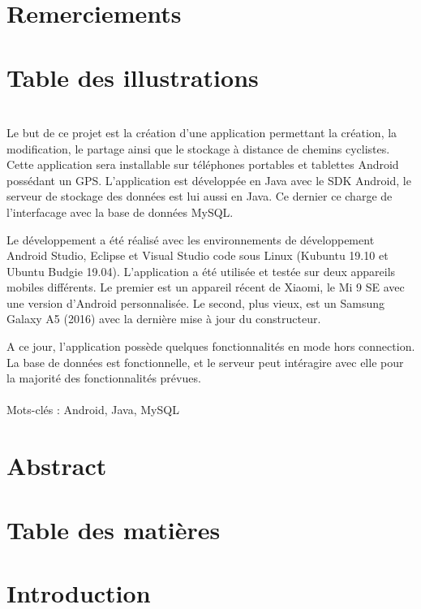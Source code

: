 \documentclass[a4paper, 12pt]{report}
\begin{document}
\section*{Remerciements}
\section*{Table des illustrations}
\newpage
\section*{}
	\indent
	Le but de ce projet est la création d'une application permettant la création, la modification, le partage ainsi que le stockage à distance de chemins cyclistes. 
	Cette application sera installable sur téléphones portables et tablettes Android possédant un GPS. L'application est développée en Java avec le SDK Android, le serveur de stockage des données est lui aussi en Java.
	Ce dernier ce charge de l'interfacage avec la base de données MySQL.
	\\\par
	Le développement a été réalisé avec les environnements de développement Android Studio, Eclipse et Visual Studio code sous Linux (Kubuntu 19.10 et Ubuntu Budgie 19.04). L'application a été utilisée et testée sur deux appareils mobiles différents.
	Le premier est un appareil récent de Xiaomi, le Mi 9 SE avec une version d'Android personnalisée.
	Le second, plus vieux, est un Samsung Galaxy A5 (2016) avec la dernière mise à jour du constructeur.
	\\\par
	A ce jour, l'application possède quelques fonctionnalités en mode hors connection.
	La base de données est fonctionnelle, et le serveur peut intéragire avec elle pour la majorité des fonctionnalités prévues.
	\\\\
	Mots-clés : Android, Java, MySQL
\section*{Abstract}
\section*{Table des matières}
\section*{Introduction}




\end{document}

